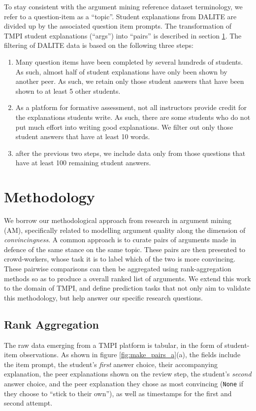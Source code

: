 \documentclass[notitlepage,12pt]{jedm}
\begin{document}
To stay consistent with the argument mining reference dataset terminology, we 
refer to a question-item as a ``topic''.
Student explanations from DALITE are divided up by the associated question item 
prompts.
The transformation of TMPI student explanations (``args'') into ``pairs'' is 
described in section \ref{sec:methodology}. 
The filtering of DALITE data is based on the following three steps:
\begin{enumerate}
	\item Many question items have been completed by several hundreds of 
	students. 
	As such, almost half of student explanations have only been shown by 
	another peer. 
	As such, we retain only those student answers that have been shown to at 
	least 5 other students.
	\item As a platform for formative assessment, not all instructors provide 
	credit for the explanations students write.
	As such, there are some students who do not put much effort into writing 
	good explanations.
	We filter out only those student answers that have at least 10 words.
	\item after the previous two steps, we include data only from those 
	questions that have at least 100 remaining student answers.
\end{enumerate}



\section{Methodology}\label{sec:methodology}

We borrow our methodological approach from research in argument mining (AM), 
specifically related to modelling argument quality along the dimension of 
\textit{convincingness}.
A common approach is to curate pairs of arguments made in defence of the same 
stance on the same topic.
These pairs are then presented to crowd-workers, whose task it is to label 
which of the two is more convincing. 
These pairwise comparisons can then be aggregated using rank-aggregation 
methods so as to produce a overall ranked list of arguments.
We extend this work to the domain of TMPI, and define prediction tasks that not 
only aim to validate this methodology, but help answer our specific research 
questions.

\subsection{Rank Aggregation}\label{sec:rank_agg}
The raw data emerging from a TMPI platform is tabular, in the form of 
student-item observations.
As shown in figure \ref{fig:make_pairs_a}(a), the fields include the item 
prompt, the student's \textit{first} answer choice, their accompanying 
explanation, the peer explanations shown on the review step, the student's 
\textit{second} answer choice, and the peer explanation they chose as most 
convincing (\verb|None| if they choose to ``stick to their own''), as well as 
timestamps for the first and second attempt.
\end{document}

